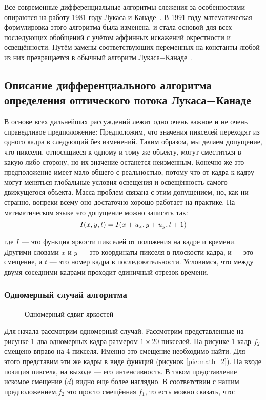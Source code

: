 Все современные дифференциальные алгоритмы слежения за особенностями опираются на работу 1981 году Лукаса и Канаде~\cite{Lucas1981}. В 1991 году математическая формулировка этого алгоритма была изменена, и стала основой для всех последующих обобщений с учётом аффинных искажений окрестности и освещённости. Путём замены соответствующих переменных на константы любой из них превращается в обычный алгоритм Лукаса−Канаде~\cite{lk_jou}.
\subsection{Описание дифференциального алгоритма определения оптического потока Лукаса−Канаде}
\label{subsec:lycas_kanade_81}
В основе всех дальнейших рассуждений лежит одно очень важное и не очень справедливое предположение: Предположим, что значения пикселей переходят из одного кадра в следующий без изменений. Таким образом, мы делаем допущение, что пиксели, относящиеся к одному и тому же объекту, могут сместиться в какую либо сторону, но их значение останется неизменным. Конечно же это предположение имеет мало общего с реальностью, потому что от кадра к кадру могут меняться глобальные условия освещения и освещённость самого движущегося объекта. Масса проблем связана с этим допущением, но, как ни странно, вопреки всему оно достаточно хорошо работает на практике. На математическом языке это допущение можно записать так:
\begin{equation}
\numberwithin{equation}{section}
\label{eq:f_0}
I(x,y,t)=I(x+u_x,y+u_y,t+1)
\end{equation}

где $I$ — это функция яркости пикселей от положения на кадре и времени. Другими словами $x$ и $y$ — это координаты пикселя в плоскости кадра, и — это смещение, а $t$ — это номер кадра в последовательности. Условимся, что между двумя соседними кадрами проходит единичный отрезок времени.
\subsubsection{Одномерный случай алгоритма}

\begin{figure}[ht]
\caption{Одномерный сдвиг яркостей}
\label{pic:math_1}
\end{figure}

Для начала рассмотрим одномерный случай. Рассмотрим представленные на рисунке \ref{pic:math_1} два одномерных кадра размером $1 \times 20$ пикселей. На рисунке \ref{pic:math_1} кадр $f_2$ смещено вправо на 4 пикселя. Именно это смещение необходимо найти. Для этого представим эти же кадры в виде функций (рисунок \ref{pic:math_2}). На входе позиция пикселя, на выходе — его интенсивность. В таком представление искомое смещение ($d$) видно еще более наглядно. В соответствии с нашим предположением,$f_2$ это просто смещённая $f_1$, то есть можно сказать, что:

